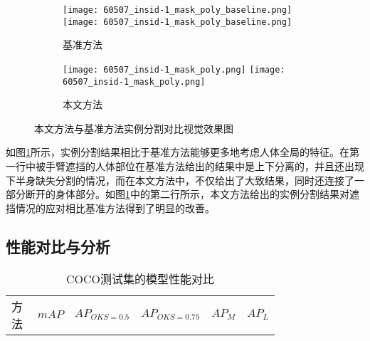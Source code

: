 \begin{outstandingabstract}
\begin{figure}[H]
\begin{minipage}{\linewidth}
			\vskip5pt
			\begin{subfigure}[b]{0.45\linewidth}
				\begin{minipage}{\linewidth}
					\centering
					{\texttt{[image: 60507\_insid-1\_mask\_poly\_baseline.png]}}
					{\texttt{[image: 60507\_insid-1\_mask\_poly\_baseline.png]}}
				\end{minipage}
				\caption{基准方法\cite{He2017Mask}}
			\end{subfigure}
			\begin{subfigure}[b]{0.45\linewidth}
				\begin{minipage}{\linewidth}
					\centering
					{\texttt{[image: 60507\_insid-1\_mask\_poly.png]}}
					{\texttt{[image: 60507\_insid-1\_mask\_poly.png]}}
				\end{minipage}
				\caption{本文方法}
			\end{subfigure}
		\end{minipage}
		\caption{本文方法与基准方法实例分割对比视觉效果图}
		\label{fig:comparison_mask}
	\end{figure}
	如图\ref{fig:comparison_mask}所示，实例分割结果相比于基准方法能够更多地考虑人体全局的特征。在第一行中被手臂遮挡的人体部位在基准方法给出的结果中是上下分离的，并且还出现下半身缺失分割的情况，而在本文方法中，不仅给出了大致结果，同时还连接了一部分断开的身体部分。如图\ref{fig:comparison_mask}中的第二行所示，本文方法给出的实例分割结果对遮挡情况的应对相比基准方法得到了明显的改善。
	

    \subsection{性能对比与分析}
    \begin{table}[H]
    	\centering
    	\caption{COCO测试集的模型性能对比}
    	\label{tab:mAPCOCObenchmark}
    	\begin{minipage}[t]{0.8\linewidth}
    		\begin{tabular}{p{0.25\linewidth}p{0.1\linewidth}<{\centering}p{0.1\linewidth}<{\centering}p{0.1\linewidth}<{\centering}p{0.1\linewidth}<{\centering}p{0.1\linewidth}<{\centering}}
    			\hline
    			方法 & \multicolumn{1}{c}{$mAP$} & \multicolumn{1}{c}{$AP_{OKS=0.5}$} & \multicolumn{1}{c}{$AP_{OKS=0.75}$}
    			& \multicolumn{1}{c}{$AP_M$} & \multicolumn{1}{c}{$AP_L$} \\
    			

\end{tabular}
\end{minipage}
\end{table}
\end{outstandingabstract}
